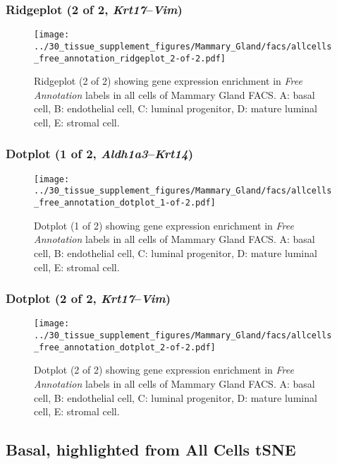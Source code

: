 \clearpage

\subsubsection{Ridgeplot (2 of 2, \emph{Krt17}--\emph{Vim})}
\begin{figure}[h]
\centering
\texttt{[image: ../30\_tissue\_supplement\_figures/Mammary\_Gland/facs/allcells\_free\_annotation\_ridgeplot\_2-of-2.pdf]}

\caption{ Ridgeplot (2 of 2)  showing gene expression enrichment in \emph{Free Annotation} labels in all cells of Mammary Gland FACS. A: basal cell, B: endothelial cell, C: luminal progenitor, D: mature luminal cell, E: stromal cell.}
\end{figure}


\clearpage

\subsubsection{Dotplot (1 of 2, \emph{Aldh1a3}--\emph{Krt14})}
\begin{figure}[h]
\centering
\texttt{[image: ../30\_tissue\_supplement\_figures/Mammary\_Gland/facs/allcells\_free\_annotation\_dotplot\_1-of-2.pdf]}

\caption{ Dotplot (1 of 2)  showing gene expression enrichment in \emph{Free Annotation} labels in all cells of Mammary Gland FACS. A: basal cell, B: endothelial cell, C: luminal progenitor, D: mature luminal cell, E: stromal cell.}
\end{figure}


\clearpage

\subsubsection{Dotplot (2 of 2, \emph{Krt17}--\emph{Vim})}
\begin{figure}[h]
\centering
\texttt{[image: ../30\_tissue\_supplement\_figures/Mammary\_Gland/facs/allcells\_free\_annotation\_dotplot\_2-of-2.pdf]}

\caption{ Dotplot (2 of 2)  showing gene expression enrichment in \emph{Free Annotation} labels in all cells of Mammary Gland FACS. A: basal cell, B: endothelial cell, C: luminal progenitor, D: mature luminal cell, E: stromal cell.}
\end{figure}


\clearpage
\subsection{Basal, highlighted from All Cells tSNE}
